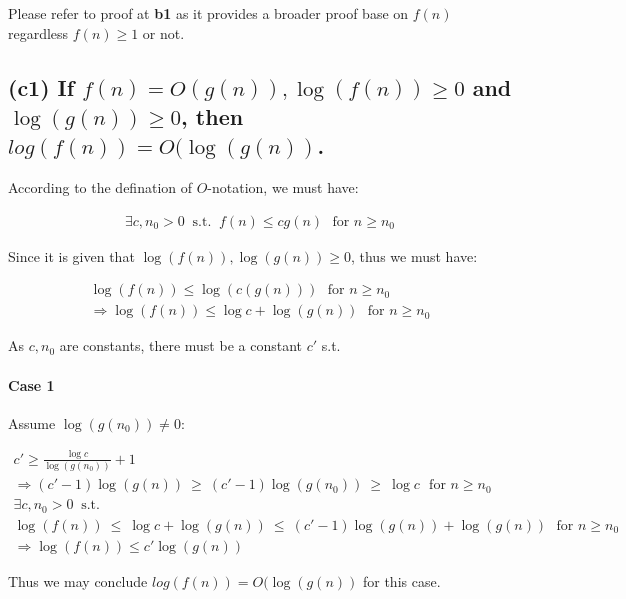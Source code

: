 \documentclass[12pt]{article}
\begin{document}
Please refer to proof at \textbf{b1} as it provides a broader proof base on $f(n)$ regardless $f(n) \geq 1$ or not.


\subsection{(c1) If $f(n) = O(g(n)), \log(f(n)) \geq 0$ and $\log(g(n)) \geq 0$, then $log(f(n)) = O(\log(g(n))$.}

According to the defination of $O$-notation, we must have:

\begin{gather}
    \exists c, n_{0} > 0 \ \text{ s.t. } \ f(n) \leq cg(n) \ \ \ \text{for $n \geq n_{0}$}
\end{gather}


Since it is given that $\log(f(n)), \log(g(n)) \geq 0$, thus we must have:

\begin{gather}
    \log(f(n)) \leq \log(c(g(n))) \ \ \ \text{for $n \geq n_{0}$} \nonumber\\
    \Rightarrow \log(f(n)) \leq \log c + \log(g(n)) \ \ \ \text{for $n \geq n_{0}$}
\end{gather}

As $c, n_{0}$ are constants, there must be a constant $c'$ s.t.

\paragraph{Case 1} Assume $\log (g(n_{0})) \neq 0$:

\begin{gather}
    c' \geq \frac{\log c}{\log (g(n_{0}))} + 1 \\
    \Rightarrow (c' -1)\log (g(n))  \ \geq \ (c' -1)\log (g(n_{0})) \ \geq \ \log c \ \ \ \text{for $n \geq n_{0}$} \\
    \exists c, n_{0} > 0 \nonumber \ \text{ s.t. } \  \\
    \log(f(n)) \ \leq \ \log c + \log(g(n)) \ \leq \  (c' -1)\log (g(n)) + \log(g(n))\ \ \ \text{for $n \geq n_{0}$} \\
    \Rightarrow \log(f(n))  \leq c'\log (g(n))
\end{gather}

Thus we may conclude $log(f(n)) = O(\log(g(n))$ for this case.
\end{document}
